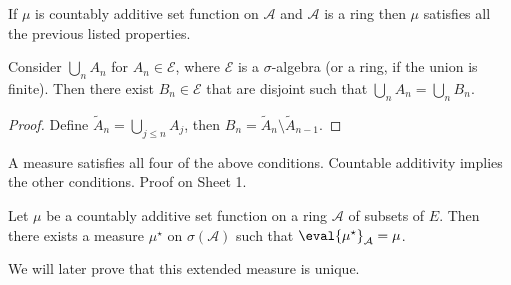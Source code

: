 \begin{remark}
	If $\mu$ is countably additive set function on $\mathcal{A}$ and $\mathcal{A}$ is a ring then $\mu$ satisfies all the previous listed properties.
\end{remark}

\begin{proposition}
	Consider $\bigcup_n A_n$ for $A_n \in \mathcal E$, where $\mathcal E$ is a $\sigma$-algebra (or a ring, if the union is finite).
	Then there exist $B_n \in \mathcal E$ that are disjoint such that $\bigcup_n A_n = \bigcup_n B_n$.
\end{proposition}

\begin{proof}
	Define $\widetilde A_n = \bigcup_{j \leq n} A_j$, then $B_n = \widetilde A_n \setminus \widetilde A_{n-1}$.
\end{proof}

\begin{remark} \label{rem:1}
	A measure satisfies all four of the above conditions. Countable additivity implies the other conditions. Proof on Sheet 1.
\end{remark}

\begin{theorem} \label{thm:car}
	Let $\mu$ be a countably additive set function on a ring $\mathcal A$ of subsets of $E$.
	Then there exists a measure $\mu^\star$ on $\sigma(\mathcal A)$ such that $\eval{\mu^\star}_{\mathcal A} = \mu$.
\end{theorem}

We will later prove that this extended measure is unique.

